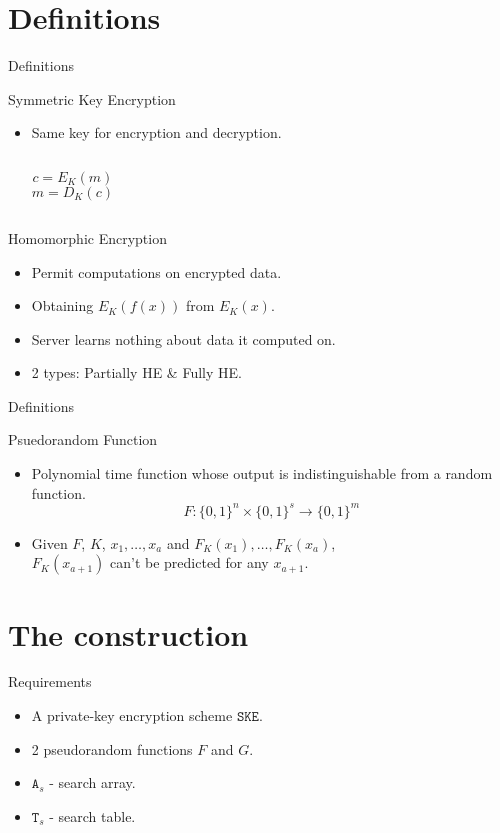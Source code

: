 \documentclass{beamer}
\begin{document}
\section{Definitions}
\begin{frame}{Definitions}

\begin{block}{Symmetric Key Encryption}
\begin{itemize}
\item Same key for encryption and decryption.
\begin{columns}
	\[c = E_K(m)\]
	\[m = D_K(c)\]
\end{columns}
\end{itemize}
\end{block}

\begin{block}{Homomorphic Encryption}
\begin{itemize}
\item Permit computations on encrypted data.
\item Obtaining \(E_K(f(x))\) from \(E_K(x)\).
\item Server learns nothing about data it computed on.
\item 2 types: Partially HE \& Fully HE.
\end{itemize}
\end{block}

\end{frame}

\begin{frame}{Definitions}
\begin{block}{Psuedorandom Function}
\begin{itemize}
\item Polynomial time function whose output is indistinguishable from a
random function.
\[F \colon \{0,1\}^n \times \{0,1\}^s \rightarrow \{0,1\}^m\]
\item Given \(F\), \(K\), \(x_1, \dotsc, x_a\) and
	\(F_K(x_1),\dotsc,F_K(x_a)\), \\ \(F_K(x_{a+1})\) can't be predicted for any \(x_{a+1}\).
\end{itemize}
\end{block}
\end{frame}


\section{The construction}
\begin{frame}{Requirements}
\begin{itemize}
\item A private-key encryption scheme \(\mathtt{SKE}\).
\item 2 pseudorandom functions \(F\) and \(G\).
\item \(\mathtt{A}_s\) - search array.
\item \(\mathtt{T}_s\) - search table.
\end{itemize}
\end{frame}
\end{document}
